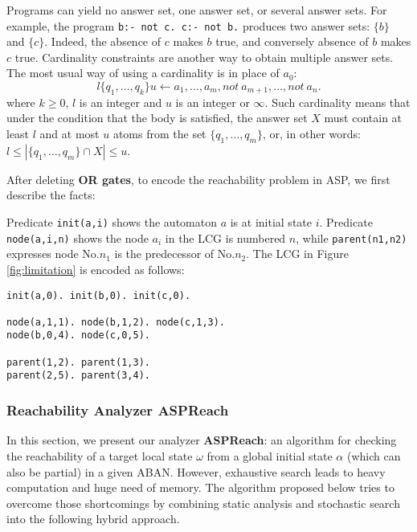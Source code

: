 Programs can yield no answer set, one answer set, or several answer sets. 
For example, the program \texttt{b:- not c. c:- not b.}  produces two answer sets: $\{b\}$ and $\{c\}$.
Indeed, the absence of $c$ makes $b$ true, and conversely absence of $b$ makes $c$ true. 
Cardinality constraints are another way to obtain multiple answer sets. 
The most usual way of using a cardinality is in place of $a_0$:
$$l \{q_1, \ldots , q_k \} u \gets a_1, \ldots , a_m, not\ a_{m+1}, \ldots , not\ a_n.$$
where $k \geq 0$, $l$ is an integer and $u$ is an integer or $\infty$. 
Such cardinality means that under the condition that the body is satisfied, the answer set $X$ must contain at least $l$ and at most $u$ atoms from the set $\{q_1, \ldots  , q_m\}$, or, in other words: $l \leq |\{q_1, \ldots  , q_m\} \cap X| \leq u$. %

After deleting \textbf{OR gates}, to encode the reachability problem in ASP, we first describe the facts:

Predicate \texttt{init(a,i)} shows the automaton $a$ is at initial state $i$. %
Predicate \texttt{node(a,i,n)} shows the node $a_i$ in the LCG is numbered $n$, while \texttt{parent(n1,n2)} expresses node No.$n_1$ is the predecessor of No.$n_2$.
The LCG in Figure \ref{fig:limitation} is encoded as follows:
\begin{Verbatim}[commandchars=\\\{\}]
init(a,0). init(b,0). init(c,0).

node(a,1,1). node(b,1,2). node(c,1,3).
node(b,0,4). node(c,0,5).

parent(1,2). parent(1,3).
parent(2,5). parent(3,4).
\end{Verbatim}
\subsubsection{Reachability Analyzer ASPReach}
In this section, we present our analyzer \textbf{ASPReach}: an algorithm for checking the reachability of a target local state $\omega$ from a global initial state $\alpha$ (which can also be partial) in a given ABAN.
However, exhaustive search leads to heavy computation and huge need of memory.
The algorithm proposed below tries to overcome those shortcomings by combining static analysis and stochastic search into the following hybrid approach.

